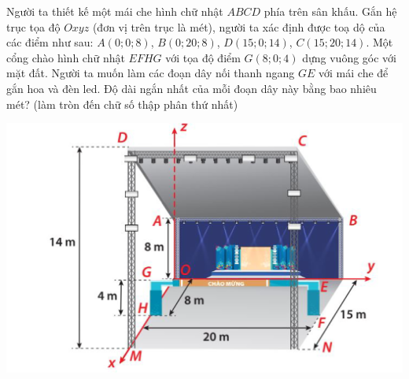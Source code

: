 \begin{ex}%
Người ta thiết kế một mái che hình chữ nhật $ ABCD $ phía trên sân khấu. Gắn hệ trục tọa độ $ Oxyz $ (đơn vị trên trục là mét), người ta xác định được toạ dộ của các điểm như sau: $ A(0;0;8)$, $B(0;20;8)$, $D(15;0;14)$, $C(15;20;14) $. Một cổng chào hình chữ nhật $ EFHG $ với tọa độ điểm $ G(8;0;4) $ dựng vuông góc với mặt đất. Người ta muốn làm các đoạn dây nối thanh ngang $ GE $ với mái che để gắn hoa và đèn led. Độ dài ngắn nhất của mỗi đoạn dây này bằng bao nhiêu mét? (làm tròn đến chữ số thập phân thứ nhất)
\begin{center}
\includegraphics[scale=.3]{images/2P5-1-H5-16}
\end{center}
\end{ex}



